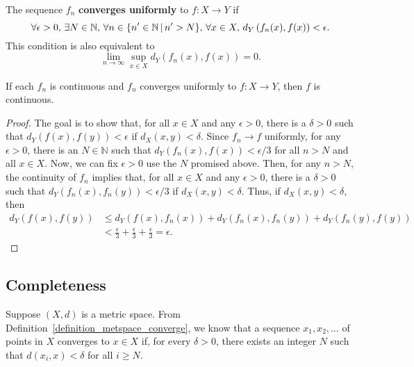 \begin{definition}
The sequence $f_n$ \textbf{converges uniformly} to $f \colon X \to Y$ if \vspace{-1mm}
\[ \forall \epsilon > 0, \, \exists N\in \mathbb{N}, \, \forall n \in \{ n' \in \mathbb{N}\,|\, n'>N \}, \, \forall x\in X, \, d_Y \left( f_n(x),f(x) \right) < \epsilon. \vspace*{-1mm} \]
This condition is also equivalent to \vspace{-1mm}
\[ \lim_{n\to \infty} \sup_{x\in X} d_Y \left( f_n (x) , f(x) \right) = 0. \]
 \end{definition}

\begin{theorem}
If each $f_n$ is continuous and $f_n$ converges uniformly to $f \colon X \to Y$, then $f$ is continuous.
\end{theorem}
\begin{proof}
The goal is to show that, for all $x\in X$ and any $\epsilon > 0$, there is a $\delta>0$ such that $d_Y (f (x),f (y)) < \epsilon$ if $d_X (x,y) < \delta$.
Since $f_n \to f$ uniformly, for any $\epsilon >0$, there is an $N\in \mathbb{N}$ such that $d_Y (f_n (x), f(x) ) < \epsilon / 3$ for all $n > N$ and all $x\in X$.
Now, we can fix $\epsilon > 0$ use the $N$ promised above.
Then, for any $n>N$, the continuity of $f_n$ implies that, for all $x\in X$ and any $\epsilon >0$, there is a $\delta>0$ such that $d_Y (f_n (x),f_n(y)) < \epsilon/3$ if $d_X (x,y) < \delta$.
Thus, if $d_X (x,y) < \delta$, then
\begin{align*}
d_Y (f(x),f(y))
&\leq d_Y (f(x),f_n (x)) + d_Y (f_n (x) ,f_n (y) ) + d_Y (f_n (y), f(y) ) \\
& < \frac{\epsilon}{3} + \frac{\epsilon}{3} + \frac{\epsilon}{3} = \epsilon.
\end{align*}
\end{proof}


\subsection{Completeness}
\label{sec:metspace_complete}
Suppose $(X,d)$ is a metric space.
From Definition~\ref{definition_metspace_converge}, we know that a sequence $x_1, x_2, \ldots$ of points in $X$ converges to $x \in X$ if, for every $\delta >0$, there exists an integer $N$ such that $d(x_i,x)<\delta$ for all $i \geq N$.

